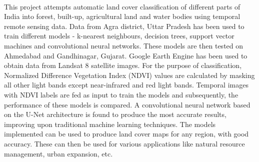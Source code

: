 \documentclass[12pt, a4paper]{report}
\begin{document}
\begin{onehalfspace}
\paragraph{}
This project attempts automatic land cover classification of different parts of India into forest, built-up, agricultural land and water bodies using temporal remote sensing data. Data from Agra district, Uttar Pradesh has been used to train different models - k-nearest neighbours, decision trees, support vector machines and convolutional neural networks. These models are then tested on Ahmedabad and Gandhinagar, Gujarat. Google Earth Engine has been used to obtain data from Landsat 8 satellite images. For the purpose of classification, Normalized Difference Vegetation Index (NDVI) values are calculated by masking all other light bands except near-infrared and red light bands. Temporal images with NDVI labels are fed as input to train the models and subsequently, the performance of these models is compared. A convolutional neural network based on the U-Net architecture is found to produce the most accurate results, improving upon traditional machine learning techniques. The models implemented can be used to produce land cover maps for any region, with good accuracy. These can then be used for various applications like natural resource management, urban expansion, etc.
\end{onehalfspace}
\newpage

\end{document}
